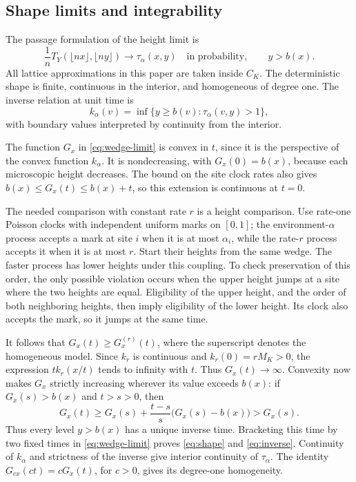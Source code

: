 \documentclass[11pt]{amsart}
\theoremstyle{remark}
\numberwithin{equation}{section}
\begin{document}
\subsection{Shape limits and integrability}
The passage formulation of the height limit is
\begin{equation}\label{eq:shape}
 \frac1n T_Y(\lfloor nx\rfloor,\lfloor ny\rfloor)
 \to\tau_\alpha(x,y)
 \quad\text{in probability},\qquad y>b(x).
\end{equation}
All lattice approximations in this paper are taken inside $C_K$.
The deterministic shape is finite, continuous in the interior, and
homogeneous of degree one. The inverse relation at unit time is
\begin{equation}\label{eq:inverse}
 k_\alpha(v)=\inf\{y\geq b(v):\tau_\alpha(v,y)>1\},
\end{equation}
with boundary values interpreted by continuity from the interior.

The function $G_x$ in \eqref{eq:wedge-limit} is
convex in $t$, since it is the perspective of the convex function
$k_\alpha$. It is nondecreasing, with $G_x(0)=b(x)$, because each
microscopic height decreases. The bound on the site clock rates also
gives $b(x)\leq G_x(t)\leq b(x)+t$, so this extension is continuous
at $t=0$.

The needed comparison with constant rate $r$ is a height comparison.
Use rate-one Poisson clocks with independent uniform marks on $[0,1]$;
the environment-$\alpha$ process accepts a mark at site $i$ when it
is at most $\alpha_i$, while the rate-$r$ process accepts it when it
is at most $r$. Start their heights from the same wedge. The faster
process has lower heights under this coupling. To check preservation
of this order, the only possible violation occurs when the upper
height jumps at a site where the two heights are equal. Eligibility
of the upper height, and the order of both neighboring heights, then
imply eligibility of the lower height. Its clock also accepts the
mark, so it jumps at the same time.

It follows that $G_x(t)\geq G_x^{(r)}(t)$, where the superscript
denotes the homogeneous model. Since $k_r$ is continuous and
$k_r(0)=rM_K>0$, the expression $t k_r(x/t)$ tends to infinity with
$t$. Thus $G_x(t)\to\infty$. Convexity now makes $G_x$
strictly increasing wherever its value exceeds $b(x)$: if
$G_x(s)>b(x)$ and $t>s>0$, then
\[
 G_x(t)\geq G_x(s)+\frac{t-s}{s}\bigl(G_x(s)-b(x)\bigr)>G_x(s).
\]
Thus every level $y>b(x)$ has a unique inverse time. Bracketing this
time by two fixed times in \eqref{eq:wedge-limit} proves
\eqref{eq:shape} and \eqref{eq:inverse}. Continuity of $k_\alpha$
and strictness of the inverse give interior continuity of
$\tau_\alpha$. The identity $G_{cx}(ct)=cG_x(t)$, for $c>0$, gives
its degree-one homogeneity.
\end{document}
